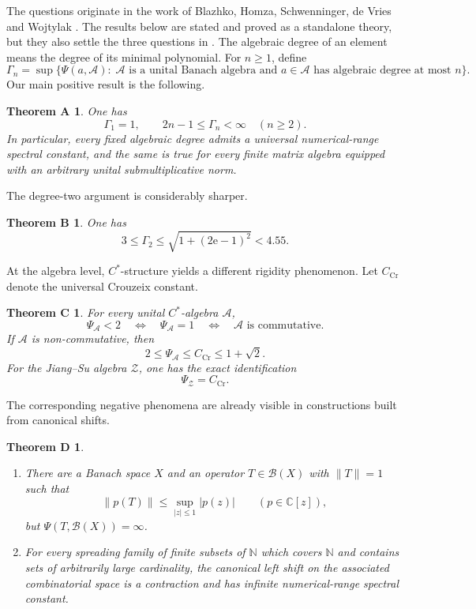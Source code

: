 \documentclass[a4paper]{amsart}
\newtheorem*{theoremA}{Theorem A}
\newtheorem*{theoremB}{Theorem B}
\newtheorem*{theoremC}{Theorem C}
\newtheorem*{theoremD}{Theorem D}
\theoremstyle{remark}
\newcommand{\C}{\mathbb C}
\newcommand{\N}{\mathbb N}
\newcommand{\calA}{\mathcal A}
\newcommand{\calB}{\mathcal B}
\begin{document}
The questions originate in the work of Blazhko, Homza, Schwenninger, de Vries
and Wojtylak \cite{BHDVW}.  The results below are stated and proved as a
standalone theory, but they also settle the three questions in
\cite[Section~8]{BHDVW}.  The algebraic degree of an element means the degree
of its minimal polynomial.  For \(n\geqslant1\), define
\[
       \Gamma_n=
       \sup \{\Psi(a,\calA):\; \calA \text{ is a unital Banach algebra and }
       a\in\calA \text{ has algebraic degree at most }n\}.
\]
Our main positive result is the following.

\begin{theoremA}
One has
\[
       \Gamma_1=1,
       \qquad
       2n-1\leqslant\Gamma_n<\infty\quad(n\geqslant2).
\]
In particular, every fixed algebraic degree admits a universal
numerical-range spectral constant, and the same is true for every finite
matrix algebra equipped with an arbitrary unital submultiplicative norm.
\end{theoremA}

The degree-two argument is considerably sharper.

\begin{theoremB}
One has
\[
       3\leqslant \Gamma_2
       \leqslant\sqrt{1+(2\mathrm e-1)^2}<4.55.
\]
\end{theoremB}

At the algebra level, \(C^*\)-structure yields a different rigidity
phenomenon.  Let \(C_{\mathrm{Cr}}\) denote the universal Crouzeix constant.

\begin{theoremC}
For every unital \(C^*\)-algebra \(\calA\),
\[
       \Psi_{\calA}<2
       \quad\Longleftrightarrow\quad
       \Psi_{\calA}=1
       \quad\Longleftrightarrow\quad
       \calA\text{ is commutative}.
\]
If \(\calA\) is non-commutative, then
\[
       2\leqslant\Psi_{\calA}\leqslant C_{\mathrm{Cr}}
       \leqslant1+\sqrt2.
\]
For the Jiang--Su algebra \(\mathcal Z\), one has the exact identification
\[
       \Psi_{\mathcal Z}=C_{\mathrm{Cr}}.
\]
\end{theoremC}

The corresponding negative phenomena are already visible in constructions built from canonical shifts.

\begin{theoremD}
\begin{enumerate}
\item There are a Banach space \(X\) and an operator \(T\in\calB(X)\) with
      \(\|T\|=1\) such that
      \[
             \|p(T)\|\leqslant\sup_{|z|\leqslant1}|p(z)|
             \qquad(p\in\C[z]),
      \]
      but \(\Psi(T,\calB(X))=\infty\).
\item For every spreading family of finite subsets of \(\N\) which covers
      \(\N\) and contains sets of arbitrarily large cardinality, the canonical
      left shift on the associated combinatorial space is a contraction and
      has infinite numerical-range spectral constant.
\end{enumerate}
\end{theoremD}
\end{document}
